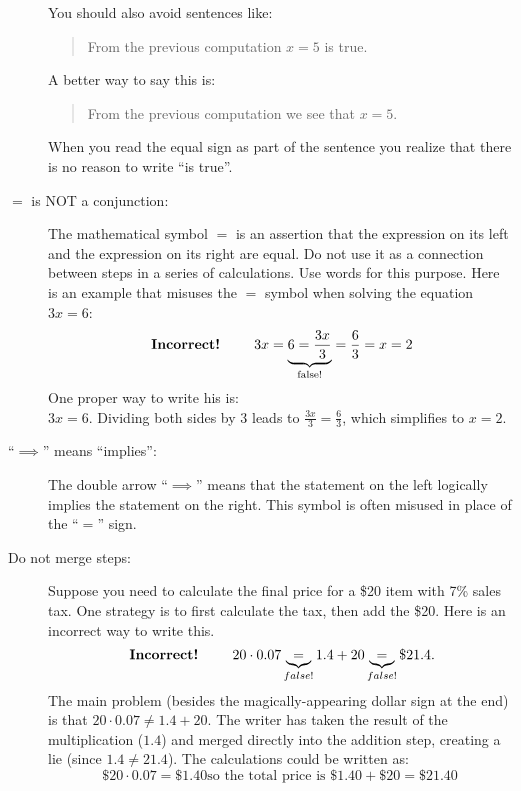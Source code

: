 \begin{description}
        You should also avoid sentences like:
        \begin{quote}
            From the previous computation $x=5$ is true.
        \end{quote}
        A better way to say this is:
        \begin{quote}
            From the previous computation we see that $x=5$.
        \end{quote}
        When you read the equal sign as part of the sentence you realize that there
        is no reason to write ``is true''.


    \item[$=$ is NOT a conjunction:] The mathematical symbol $=$ is an assertion that
        the expression on its left and the expression on its right are equal. Do not use
        it as a connection between steps in a series of calculations. Use words for this
        purpose.  Here is an example that misuses the $=$ symbol when solving the equation
        $3x=6$:
        \[ \text{ {\bf Incorrect!} } \qquad 3x = \underbrace{6 =
            \frac{3x}{3}}_{\text{false!}} = \frac{6}{3} = x = 2 \]
        One proper way to write his is: \\
        $3x=6$.  Dividing both sides by $3$ leads to $\frac{3x}{3} =
        \frac{6}{3}$, which simplifies to $x=2$.

    \item[``$\implies$'' means ``implies'':]  The double arrow ``$\implies$'' means
        that the statement on the left logically implies the statement on the right.  This
        symbol is often misused in place of the ``$=$'' sign. 

    \item[Do not merge steps:] Suppose you need to calculate the final price for a
        \$20 item with 7\% sales tax. One strategy is to first calculate the tax, then add
        the \$20. Here is an incorrect way to write this. \\
        \[ \text{ {\bf Incorrect!} } \qquad  20 \cdot 0.07 \underbrace{=}_{false!} 1.4 +
            20 \underbrace{=}_{false!} \$21.4. \]
        The main problem (besides the magically-appearing dollar sign at the end) is that
        $20 \cdot 0.07 \neq 1.4 + 20$. The writer has taken the result of the
        multiplication ($1.4$) and merged directly into the addition step, creating a lie
        (since $1.4\neq 21.4$). The calculations could be written as:
        \[ \$20 \cdot 0.07 = \$1.40 \text{so the total price is } \$1.40 + \$20 = \$21.40
            \]


\end{description}
